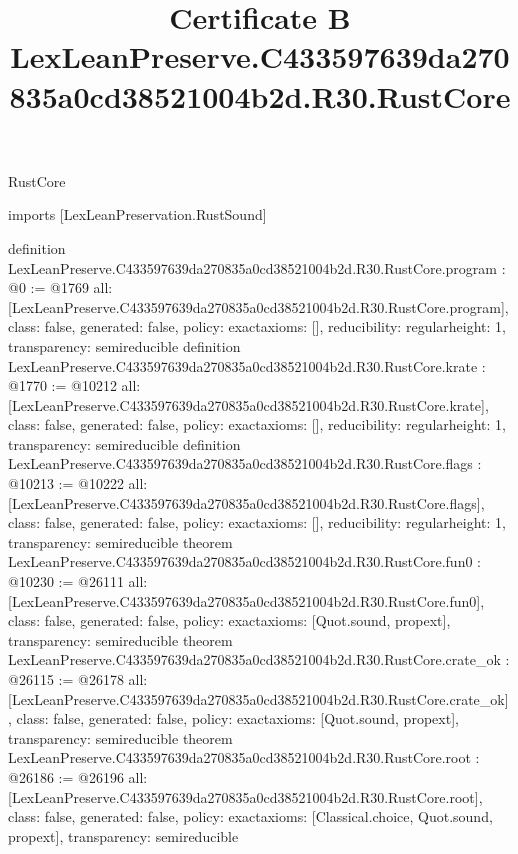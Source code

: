 \begin{lexlean}{RustCore}
\title{Certificate B LexLeanPreserve.C433597639da270835a0cd38521004b2d.R30.RustCore}
\begin{coremodule}
imports [LexLeanPreservation.RustSound]

definition LexLeanPreserve.C433597639da270835a0cd38521004b2d.R30.RustCore.program : @0 := @1769 {
  all: [LexLeanPreserve.C433597639da270835a0cd38521004b2d.R30.RustCore.program],
  class: false,
  generated: false,
  policy: exact{axioms: []},
  reducibility: regular{height: 1},
  transparency: semireducible
}
definition LexLeanPreserve.C433597639da270835a0cd38521004b2d.R30.RustCore.krate : @1770 := @10212 {
  all: [LexLeanPreserve.C433597639da270835a0cd38521004b2d.R30.RustCore.krate],
  class: false,
  generated: false,
  policy: exact{axioms: []},
  reducibility: regular{height: 1},
  transparency: semireducible
}
definition LexLeanPreserve.C433597639da270835a0cd38521004b2d.R30.RustCore.flags : @10213 := @10222 {
  all: [LexLeanPreserve.C433597639da270835a0cd38521004b2d.R30.RustCore.flags],
  class: false,
  generated: false,
  policy: exact{axioms: []},
  reducibility: regular{height: 1},
  transparency: semireducible
}
theorem LexLeanPreserve.C433597639da270835a0cd38521004b2d.R30.RustCore.fun0 : @10230 := @26111 {
  all: [LexLeanPreserve.C433597639da270835a0cd38521004b2d.R30.RustCore.fun0],
  class: false,
  generated: false,
  policy: exact{axioms: [Quot.sound, propext]},
  transparency: semireducible
}
theorem LexLeanPreserve.C433597639da270835a0cd38521004b2d.R30.RustCore.crate_ok : @26115 := @26178 {
  all: [LexLeanPreserve.C433597639da270835a0cd38521004b2d.R30.RustCore.crate_ok],
  class: false,
  generated: false,
  policy: exact{axioms: [Quot.sound, propext]},
  transparency: semireducible
}
theorem LexLeanPreserve.C433597639da270835a0cd38521004b2d.R30.RustCore.root : @26186 := @26196 {
  all: [LexLeanPreserve.C433597639da270835a0cd38521004b2d.R30.RustCore.root],
  class: false,
  generated: false,
  policy: exact{axioms: [Classical.choice, Quot.sound, propext]},
  transparency: semireducible
}


\end{coremodule}
\end{lexlean}
